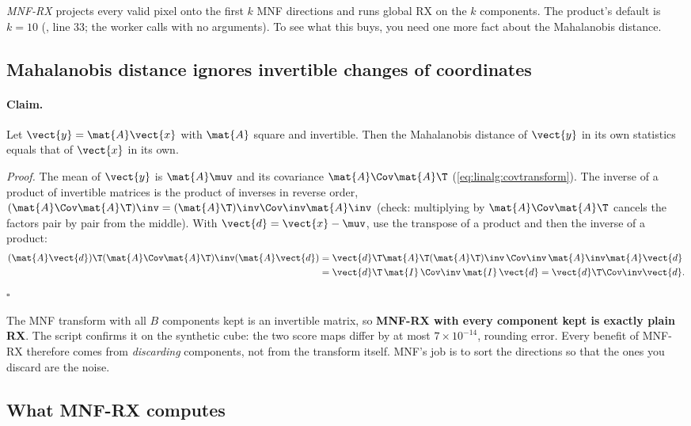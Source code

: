 \emph{MNF-RX} projects every valid pixel onto the first $k$ MNF directions and runs global
RX on the $k$ components. The product's default is $k = 10$
(,  line 33; the worker calls
 with no arguments). To see what this buys, you need one more fact about the Mahalanobis
distance.

\subsection{Mahalanobis distance ignores invertible changes of coordinates}

\paragraph{Claim.} Let $\vect{y} = \mat{A}\vect{x}$ with $\mat{A}$ square and invertible. Then the
Mahalanobis distance of $\vect{y}$ in its own statistics equals that of $\vect{x}$ in its own.

\noindent\textit{Proof.} The mean of $\vect{y}$ is $\mat{A}\muv$ and its covariance
$\mat{A}\Cov\mat{A}\T$ (\cref{eq:linalg:covtransform}). The inverse of a product of invertible matrices
is the product of inverses in reverse order, $(\mat{A}\Cov\mat{A}\T)\inv = (\mat{A}\T)\inv\Cov\inv\mat{A}\inv$
(check: multiplying by $\mat{A}\Cov\mat{A}\T$ cancels the factors pair by pair from the middle). With
$\vect{d} = \vect{x} - \muv$, use the transpose of a product and then the inverse of a product:
\begin{align*}
(\mat{A}\vect{d})\T(\mat{A}\Cov\mat{A}\T)\inv(\mat{A}\vect{d})
&= \vect{d}\T\mat{A}\T(\mat{A}\T)\inv\,\Cov\inv\,\mat{A}\inv\mat{A}\vect{d}\\
&= \vect{d}\T\,\mat{I}\,\Cov\inv\,\mat{I}\,\vect{d} = \vect{d}\T\Cov\inv\vect{d}.
\end{align*}
\hfill$\square$

The MNF transform with all $B$ components kept is an invertible matrix, so \textbf{MNF-RX with every
component kept is exactly plain RX}. The script confirms it on the synthetic cube: the two score maps
differ by at most $7\times10^{-14}$\tagC, rounding error. Every benefit of MNF-RX therefore comes from
\emph{discarding} components, not from the transform itself. MNF's job is to sort the directions so
that the ones you discard are the noise.

\subsection{What MNF-RX computes}

